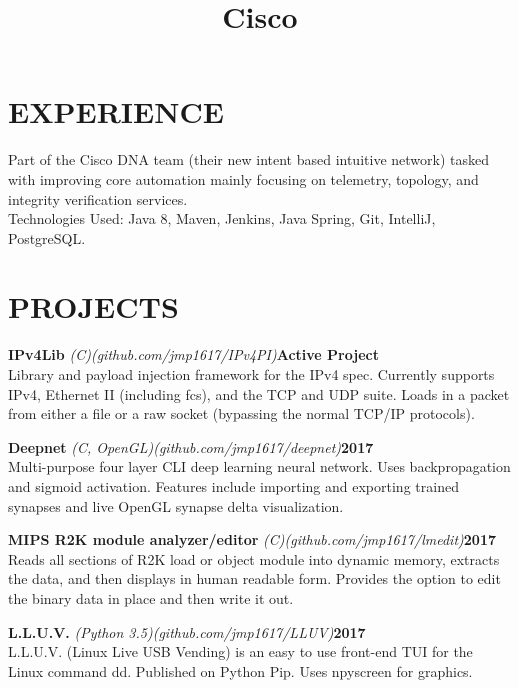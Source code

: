 \documentclass[line,margin]{res}
\begin{document}
\begin{resume}
\section{EXPERIENCE}
\title{\textbf{Cisco}}
\begin{position}
Part of the Cisco DNA team (their new intent based intuitive network) tasked with improving core automation mainly focusing on telemetry, topology, and integrity verification services.
\\
Technologies Used: 
Java 8, Maven, Jenkins, Java Spring, Git, IntelliJ, PostgreSQL.  
\end{position}

\section{PROJECTS}
\par
    {\textbf{IPv4Lib}}
    {\sl (C)}{\sl (github.com/jmp1617/IPv4PI)}\hfill \textbf{Active Project}\\ 
    Library and payload injection framework for the IPv4 spec. Currently 
    supports IPv4, Ethernet II (including fcs), and the TCP and UDP suite. Loads 
    in a packet from either a file or a raw socket (bypassing the normal 
    TCP/IP protocols).
\par
    {\textbf{Deepnet}}
    {\sl (C, OpenGL)}{\sl (github.com/jmp1617/deepnet)}\hfill \textbf{2017}\\ 
    Multi-purpose four layer CLI deep learning neural network. Uses
    backpropagation and sigmoid activation. Features include importing and 
    exporting trained synapses and live OpenGL synapse delta visualization.
\par
    {\textbf{MIPS R2K module analyzer/editor}}
    {\sl (C)}{\sl (github.com/jmp1617/lmedit)}\hfill \textbf{2017}\\
    Reads all sections of R2K load or object module into dynamic memory, 
    extracts the data, and then displays in human readable form. Provides the 
    option to edit the binary data in place and then write it out.
\par
    {\textbf{L.L.U.V.}}
    {\sl (Python 3.5)}{\sl (github.com/jmp1617/LLUV)}\hfill \textbf{2017}\\ 
    L.L.U.V. (Linux Live USB Vending) is an easy to use front-end TUI for the 
    Linux command dd. Published on Python Pip. Uses npyscreen for graphics.


\end{resume}
\end{document}

